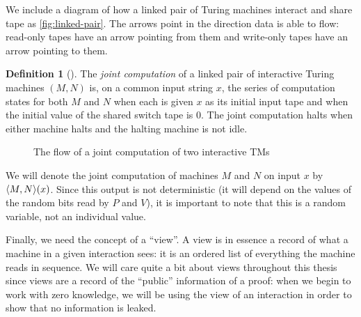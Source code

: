 \documentclass[english,12pt]{reedthesis}
\theoremstyle{plain}
\theoremstyle{definition}
\newtheorem{defn}[defn]{Definition}
\theoremstyle{remark}
\DeclarePairedDelimiter{\ang}{\langle}{\rangle}
\begin{document}
We include a diagram of how a linked pair of Turing machines interact and share
tape as \cref{fig:linked-pair}. The arrows point in the direction data is able
to flow: read-only tapes have an arrow pointing from them and write-only tapes
have an arrow pointing to them.

\begin{defn}[{\cite[Def.\ 4.2.2]{Go01}}]\label{def:joint-comp}
  The \emph{joint computation} of a linked pair of interactive Turing machines
  $(M, N)$ is, on a common input string $x$, the series of computation states
  for both $M$ and $N$ when each is given $x$ as its initial input tape and when
  the initial value of the shared switch tape is $0$. The joint computation
  halts when either machine halts and the halting machine is not idle.
\end{defn}

\begin{figure}
  \centering
  \caption{The flow of a joint computation of two interactive
    TMs}\label{fig:joint-comp-flow}
\end{figure}

We will denote the joint computation of machines $M$ and $N$ on input $x$ by
$\ang{M, N}(x)$. Since this output is not deterministic (it will depend on the
values of the random bits read by $P$ and $V$), it is important to note that
this is a random variable, not an individual value.

Finally, we need the concept of a ``view''. A view is in essence a record of
what a machine in a given interaction sees: it is an ordered list of everything
the machine reads in sequence. We will care quite a bit about views throughout
this thesis since views are a record of the ``public'' information of a proof:
when we begin to work with zero knowledge, we will be using the view of an
interaction in order to show that no information is leaked.
\end{document}
